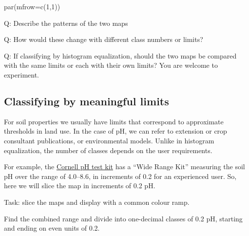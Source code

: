 \documentclass[
  letterpaper,
  DIV=11,
  numbers=noendperiod]{scrartcl}
\newenvironment{Shaded}{\begin{snugshade}}{\end{snugshade}}
\newcommand{\AttributeTok}[1]{\textcolor[rgb]{0.40,0.45,0.13}{#1}}
\newcommand{\DecValTok}[1]{\textcolor[rgb]{0.68,0.00,0.00}{#1}}
\newcommand{\FunctionTok}[1]{\textcolor[rgb]{0.28,0.35,0.67}{#1}}
\newcommand{\NormalTok}[1]{\textcolor[rgb]{0.00,0.23,0.31}{#1}}
\begin{document}
\begin{Shaded}
\begin{Highlighting}[]
\FunctionTok{par}\NormalTok{(}\AttributeTok{mfrow=}\FunctionTok{c}\NormalTok{(}\DecValTok{1}\NormalTok{,}\DecValTok{1}\NormalTok{))}
\end{Highlighting}
\end{Shaded}

Q: Describe the patterns of the two maps

Q: How would these change with different class numbers or limits?

Q: If classifying by histogram equalization, should the two maps be
compared with the same limits or each with their own limits? You are
welcome to experiment.

\hypertarget{sec-mean-limit}{%
\subsection{Classifying by meaningful limits}\label{sec-mean-limit}}

For soil properties we usually have limits that correspond to
approximate thresholds in land use. In the case of pH, we can refer to
extension or crop consultant publications, or environmental models.
Unlike in histogram equalization, the number of classes depends on the
user requirements.

For example, the \href{https://www.nnyagdev.org/PDF/SoilpH.pdf}{Cornell
pH test kit} has a ``Wide Range Kit'' measuring the soil pH over the
range of 4.0--8.6, in increments of 0.2 for an experienced user. So,
here we will slice the map in increments of 0.2 pH.

Task: slice the maps and display with a common colour ramp.

Find the combined range and divide into one-decimal classes of 0.2 pH,
starting and ending on even units of 0.2.
\end{document}
